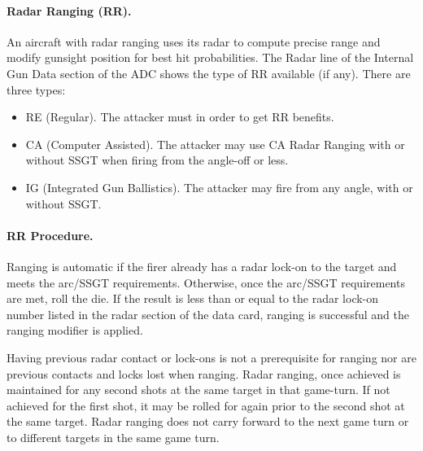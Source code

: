 \begin{advancedrules}

\paragraph{Radar Ranging (RR).} An aircraft with radar ranging uses its radar to compute precise range and modify gunsight position for best hit probabilities. The Radar line of the Internal Gun Data section of the ADC shows the type of RR available (if any). There are three types:

\begin{itemize}

\item RE (Regular). The attacker must  in order to get RR benefits.

\item CA (Computer Assisted). The attacker may use CA Radar Ranging with or without SSGT when firing from the  angle-off or less.

\item IG (Integrated Gun Ballistics). The attacker may fire from any angle, with or without SSGT.

\end{itemize}

\paragraph{RR Procedure.} Ranging is automatic if the firer already has a radar lock-on to the target and meets the arc/SSGT requirements. Otherwise, once the arc/SSGT requirements are met, roll the die. If the result is less than or equal to the radar lock-on number listed in the radar section of the data card, ranging is successful and the ranging modifier is applied.

Having previous radar contact or lock-ons is not a prerequisite for ranging nor are previous contacts and locks lost when ranging. Radar ranging, once achieved is maintained for any second shots at the same target in that game-turn. If not achieved for the first shot, it may be rolled for again prior to the second shot at the same target. Radar ranging does not carry forward to the next game turn or to different targets in the same game turn.



\end{advancedrules}
